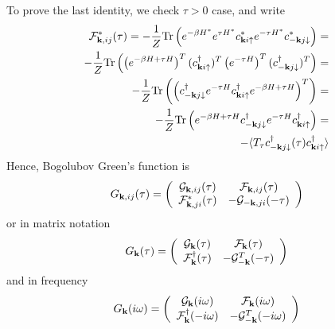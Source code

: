 \documentclass[twocolumn,prb,preprintnumbers,amsmath,amssymb,floatfix]{revtex4}
\newcommand{\cG}{{\cal G}}
\newcommand{\cF}{{\cal F}} \newcommand{\cD}{{\cal D}}
\newcommand{\Tr}{\mathrm{Tr}} \newcommand{\npsi}{\underline{\psi}}
\newcommand{\up}{\uparrow}
\newcommand{\dn}{\downarrow}
\begin{document}
To prove the last identity, we check $\tau>0$ case, and write
\begin{eqnarray}
\cF^*_{\vk,ij}(\tau)=
-\frac{1}{Z}\Tr\left(
e^{-\beta H^*} e^{\tau H^*} c^*_{\vk i \up}e^{-\tau H^*} c^*_{-\vk j \dn}
\right)=\nonumber\\
-\frac{1}{Z}\Tr\left(
\left(e^{-\beta H+\tau H}\right)^T (c^\dagger_{\vk i \up})^T \left(e^{-\tau H}\right)^T (c^\dagger_{-\vk j \dn})^T
\right)=\nonumber\\
-\frac{1}{Z}\Tr\left(
\left(
c^\dagger_{-\vk j \dn}
e^{-\tau H}
c^\dagger_{\vk i \up}
e^{-\beta H+\tau H}
\right)^T
\right)=\nonumber\\
-\frac{1}{Z}\Tr\left(
e^{-\beta H+\tau H}
c^\dagger_{-\vk j \dn}
e^{-\tau H}
c^\dagger_{\vk i \up}
\right)=\nonumber\\
-\langle
T_\tau c^\dagger_{-\vk j \dn}(\tau)c^\dagger_{\vk i \up}
\rangle
\end{eqnarray}
Hence, Bogolubov Green's function is
\begin{eqnarray}
G_{\vk,ij}(\tau)=
\left(
\begin{array}{cc}
\cG_{\vk,ij}(\tau) & \cF_{\vk,ij}(\tau)\\
\cF^*_{\vk,ji}(\tau) & -\cG_{-\vk,ji}(-\tau)
\end{array}
\right)
\end{eqnarray}
or in matrix notation
\begin{eqnarray}
G_{\vk}(\tau)=
\left(
\begin{array}{cc}
\cG_{\vk}(\tau) & \cF_{\vk}(\tau)\\
\cF^\dagger_{\vk}(\tau) & -\cG^{T}_{-\vk}(-\tau)
\end{array}
\right)
\end{eqnarray}
and in frequency
\begin{eqnarray}
G_{\vk}(i\omega)=
\left(
\begin{array}{cc}
\cG_{\vk}(i\omega) & \cF_{\vk}(i\omega)\\
\cF^\dagger_{\vk}(-i\omega) & -\cG^{T}_{-\vk}(-i\omega)
\end{array}
\right)
\end{eqnarray}
\end{document}
